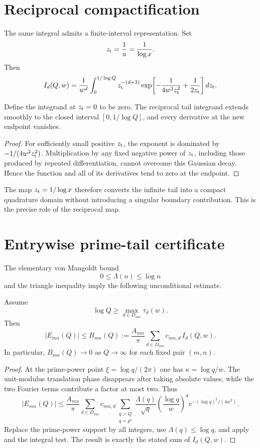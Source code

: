 \section{Reciprocal compactification}

The same integral admits a finite-interval representation. Set
\[
 z_{\rm t}=\frac1u=\frac1{\log x}.
\]
Then
\[
 I_d(Q,w)
 =
 \frac1{w^d}
 \int_0^{1/\log Q}
 z_{\rm t}^{-(d+3)}
 \exp\!\left[
 -\frac1{4w^2z_{\rm t}^2}
 +\frac1{2z_{\rm t}}
 \right]dz_{\rm t}.
\]

\begin{theorem}
\label{thm:tail-reciprocal-flat}
Define the integrand at $z_{\rm t}=0$ to be zero. The reciprocal tail
integrand extends smoothly to the closed interval
$[0,1/\log Q]$, and every derivative at the new endpoint vanishes.
\end{theorem}

\begin{proof}
For sufficiently small positive $z_{\rm t}$, the exponent is dominated by
$-1/(4w^2z_{\rm t}^2)$. Multiplication by any fixed negative power of
$z_{\rm t}$, including those produced by repeated differentiation, cannot
overcome this Gaussian decay. Hence the function and all of its derivatives
tend to zero at the endpoint.
\end{proof}

The map $z_{\rm t}=1/\log x$ therefore converts the infinite tail into a
compact quadrature domain without introducing a singular boundary
contribution. This is the precise role of the reciprocal map.

\section{Entrywise prime-tail certificate}

The elementary von Mangoldt bound
\[
 0\le\Lambda(n)\le\log n
\]
and the triangle inequality imply the following unconditional estimate.

\begin{theorem}
\label{thm:entry-tail-certificate}
Assume
\[
 \log Q\ge
 \max_{d\in D_{mn}}\tau_d(w).
\]
Then
\[
 |E_{mn}(Q)|
 \le
 B_{mn}(Q)
 :=
 \frac{A_{mn}}{\pi}
 \sum_{d\in D_{mn}}
 c_{mn,d}\,I_d(Q,w).
\]
In particular, $B_{mn}(Q)\to0$ as $Q\to\infty$ for each fixed pair
$(m,n)$.
\end{theorem}

\begin{proof}
At the prime-power point $\xi=\log q/(2\pi)$ one has
$\kappa=\log q/w$. The unit-modulus translation phase disappears after
taking absolute values, while the two Fourier terms contribute a factor at
most two. Thus
\[
 |E_{mn}(Q)|
 \le
 \frac{A_{mn}}{\pi}
 \sum_{d\in D_{mn}}c_{mn,d}
 \sum_{\substack{q>Q\\q=p^\ell}}
 \frac{\Lambda(q)}{\sqrt q}
 \left(\frac{\log q}{w}\right)^d
 e^{-(\log q)^2/(4w^2)}.
\]
Replace the prime-power support by all integers, use
$\Lambda(q)\le\log q$, and apply  and the
integral test. The result is exactly the stated sum of $I_d(Q,w)$.
\end{proof}

